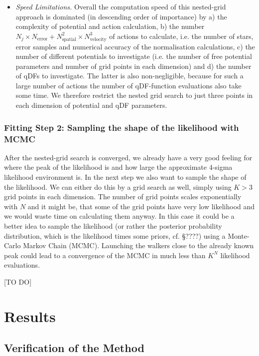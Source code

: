 \documentclass[12pt,preprint]{aastex}
\begin{document}
\begin{itemize}
\item \emph{Speed Limitations.} Overall the computation speed of this nested-grid approach is dominated (in descending order of importance) by a) the complexity of potential and action calculation, b) the number $N_j \times N_\text{error} + N_\text{spatial}^2 \times N_\text{velocity}^3$ of actions to calculate, i.e. the number of stars, error samples and numerical accuracy of the normalisation calculations, c) the number of different potentials to investigate (i.e. the number of free potential parameters and number of grid points in each dimension) and d) the number of qDFs to investigate. The latter is also non-negligible, because for such a large number of actions the number of  qDF-function evaluations also take some time. We therefore restrict the nested grid search to just three points in each dimension of potential and qDF parameters.
\end{itemize}

\subsubsection{Fitting Step 2: Sampling the shape of the likelihood with MCMC}

After the nested-grid search is converged, we already have a very good feeling for where the peak of the likelihood is and how large the approximate 4-sigma likelihood environment is. In the next step we also want to sample the shape of the likelihood. We can either do this by a grid search as well, simply using $K>3$ grid points in each dimension. The number of grid points scales exponentially with $N$ and it might be, that some of the grid points have very low likelihood and we would waste time on calculating them anyway. In this case it could be a better idea to sample the likelihood (or rather the posterior probability distribution, which is the likelihood times some priors, cf. \S ????) using a Monte-Carlo Markov Chain (MCMC). Launching the walkers close to the already known peak could lead to a convergence of the MCMC in much less than $K^N$ likelihood evaluations.

[TO DO]

\section{Results}

\subsection{Verification of the Method}
\end{document}
